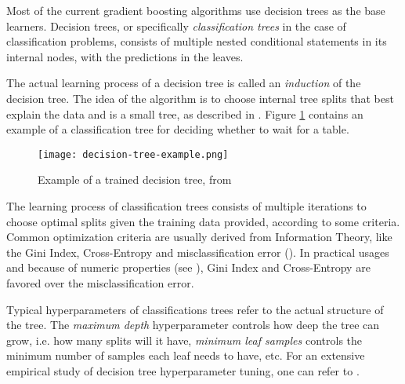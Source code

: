 Most of the current gradient boosting algorithms use decision trees as the base learners. Decision trees, or specifically \textit{classification trees} in the case of classification problems, consists of multiple nested conditional statements in its internal nodes, with the predictions in the leaves.

The actual learning process of a decision tree is called an \textit{induction} of the decision tree. The idea of the algorithm is to choose internal tree splits that best explain the data and is a small tree, as described in \cite{aima:2010}. Figure \ref{fig:decision-tree-example} contains an example of a classification tree for deciding whether to wait for a table.

\begin{figure}[H]
    \centering
    \texttt{[image: decision-tree-example.png]} 
    \caption{Example of a trained decision tree, from \cite{aima:2010}}
    \label{fig:decision-tree-example}
\end{figure}

The learning process of classification trees consists of multiple iterations to choose optimal splits given the training data provided, according to some criteria. Common optimization criteria are usually derived from Information Theory, like the Gini Index, Cross-Entropy and misclassification error (\cite{hastie2009elements}). In practical usages and because of numeric properties (see \cite{hastie2009elements}), Gini Index and Cross-Entropy are favored over the misclassification error.

Typical hyperparameters of classifications trees refer to the actual structure of the tree. The \textit{maximum depth} hyperparameter controls how deep the tree can grow, i.e. how many splits will it have, \textit{minimum leaf samples} controls the minimum number of samples each leaf needs to have, etc. For an extensive empirical study of decision tree hyperparameter tuning, one can refer to \cite{mantovani2018empirical}.
